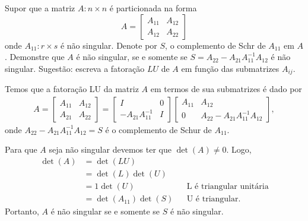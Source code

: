\documentclass[a4paper,12pt, leqno, answers]{exam}
\begin{document}
\begin{questions}
    \question Supor que a matriz $A : n \times n$ \'{e} particionada na forma
    \[
    A = \begin{bmatrix}
        A_{11} & A_{12} \\
        A_{12} & A_{22}
    \end{bmatrix}
    \]
    onde $A_{11} : r \times s$ \'{e} n\~{a}o singular. Denote por $S$, o complemento de Schr de $A_{11}$ em $A$. Demonstre que $A$ \'{e} n\~{a}o singular, se e somente se $S = A_{22} - A_{21} A_{11}^{-1} A_{12}$ \'{e} n\~{a}o singular. Sugest\~{a}o: escreva a fatora\c{c}\~{a}o $LU$ de $A$ em fun\c{c}\~{a}o das submatrizes $A_{ij}$.
    \begin{solution}
        Temos que a fatora\c{c}\~{a}o LU da matriz $A$ em termos de sua submatrizes \'{e} dado por
        \begin{align*}
            A = \begin{bmatrix}
                A_{11} & A_{12} \\
                A_{21} & A_{22}
            \end{bmatrix} = \begin{bmatrix}
                I & 0 \\
                -A_{21} A_{11}^{-1} & I
            \end{bmatrix} \begin{bmatrix}
                A_{11} & A_{12} \\
                0 & A_{22} - A_{21} A_{11}^{-1} A_{12}
            \end{bmatrix},
        \end{align*}
        onde $A_{22} - A_{21} A_{11}^{-1} A_{12} = S$ \'{e} o complemento de Schur de $A_{11}$.

        Para que $A$ seja n\~{a}o singular devemos ter que $\det(A) \neq 0$. Logo,
        \begin{align*}
            \det(A) &= \det(L U) \\
            &= \det(L) \det(U) \\
            &= 1 \det(U) && \text{L \'{e} triangular unit\'{a}ria} \\
            &= \det(A_{11}) \det(S) && \text{U \'{e} triangular}.
        \end{align*}
        Portanto, $A$ \'{e} n\~{a}o singular se e somente se $S$ \'{e} n\~{a}o singular.
    \end{solution}


\end{questions}
\end{document}
